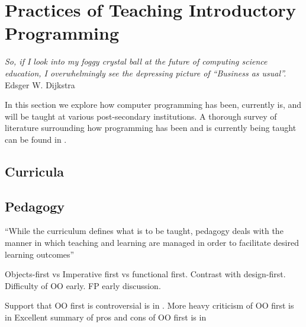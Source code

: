 \section{Practices of Teaching Introductory Programming}

\begin{flushright}
\textit{So, if I look into my foggy crystal ball at the future of computing science education, I overwhelmingly see the depressing picture of ``Business as usual''.}
\\
Edsger W. Dijkstra \cite{Dijkstra89} \\
\end{flushright}


In this section we explore how computer programming has been, currently is, and will be taught at various post-secondary institutions.  A thorough survey of literature surrounding how programming has been and is currently being taught can be found in \cite{Pears07}.

\subsection{Curricula}

\subsection{Pedagogy}

``While the curriculum defines what is to be taught, pedagogy deals with the manner in which teaching and learning are managed in order to facilitate desired learning outcomes''



Objects-first vs Imperative first vs functional first.  Contrast with design-first.  Difficulty of OO early.  FP early discussion.

Support that OO first is controversial is in \cite{Astrachan05}.  More heavy criticism of OO first is in \cite{Hu04} Excellent summary of pros and cons of OO first is in \cite{Lister06}

